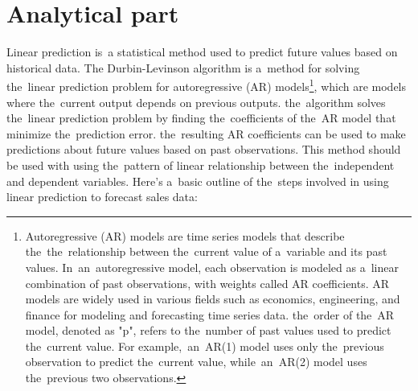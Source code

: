 
\chapter{Analytical part}\label{sec:analytical}

Linear prediction is~a statistical method used to predict future values based on historical data.
The Durbin-Levinson algorithm is a~method for solving the~linear prediction problem for autoregressive (AR)
models\footnote{Autoregressive (AR) models are time series models that describe the~the~relationship between the~current
value of a~variable and its past values. In~an~autoregressive model, each observation is modeled as a~linear
combination of past observations, with weights called AR coefficients. AR models are widely used in various fields
such as economics, engineering, and finance for modeling and forecasting time series data. the~order of the~AR model, denoted as "p", refers to the~number of past values used to predict the~current value. For example,~an~AR(1) model uses
only the~previous observation to predict the~current value, while~an~AR(2) model uses the~previous two observations.},
which are models where the~current output depends on previous outputs. the~algorithm solves the~linear prediction
problem by finding the~coefficients of the~AR model that minimize the~prediction error. the~resulting AR coefficients
can be used to make predictions about future values based on past observations. This method should be used with
using the~pattern of linear relationship between the~independent and dependent variables.
Here's a~basic outline of the~steps involved in using linear prediction to forecast sales data:\\
